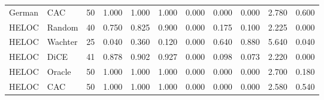 \begin{table}[t]
\begin{tabular}{llrrrrrrrrr}
German & CAC & 50 & 1.000 & 1.000 & 1.000 & 0.000 & 0.000 & 0.000 & 2.780 & 0.600 \\
HELOC & Random & 40 & 0.750 & 0.825 & 0.900 & 0.000 & 0.175 & 0.100 & 2.225 & 0.000 \\
HELOC & Wachter & 25 & 0.040 & 0.360 & 0.120 & 0.000 & 0.640 & 0.880 & 5.640 & 0.040 \\
HELOC & DiCE & 41 & 0.878 & 0.902 & 0.927 & 0.000 & 0.098 & 0.073 & 2.220 & 0.000 \\
HELOC & Oracle & 50 & 1.000 & 1.000 & 1.000 & 0.000 & 0.000 & 0.000 & 2.700 & 0.180 \\
HELOC & CAC & 50 & 1.000 & 1.000 & 1.000 & 0.000 & 0.000 & 0.000 & 2.580 & 0.540 \\
\bottomrule
\end{tabular}
\end{table}
